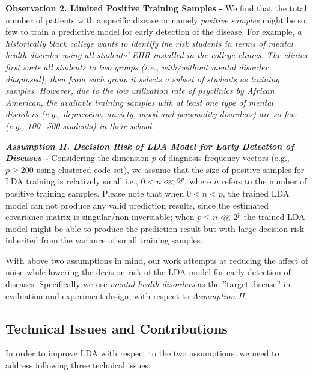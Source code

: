 \documentclass[journal,compsoc]{IEEEtran}
\begin{document}
\textbf{Observation 2. Limited Positive Training Samples - } 
We find that the total number of patients with a specific disease or namely \emph{positive samples} might be so few to train a predictive model for early detection of the disease.
For example, \emph{a historically black college wants to identify the risk students in terms of mental health disorder using all students' EHR installed in the college clinics.
The clinics first sorts all students to two groups (i.e., with/without mental disorder diagnosed), then from each group it selects a subset of students as training samples.
However, due to the low utilization rate of psyclinics by African American, the available training samples with at least one type of mental disorders (e.g., depression, anxiety, mood and personality disorders) are so few (e.g., 100$-$500 students) in their school.}  

\textbf{\em Assumption II.  Decision Risk of LDA Model for Early Detection of Diseases - } 
Considering the dimension $p$ of diagnosis-frequency vectors (e.g., $p\geq 200$ using clustered code set), we assume that the size of positive samples for LDA training is relatively small i.e., $0<n\lll 2^p$, where $n$ refers to the number of positive training samples.
Please note that when $0<n<p$, the trained LDA model can not produce any valid prediction results, since the estimated covariance matrix is singular/non-inversiable; when $p\leq n\lll 2^p$ the trained LDA model might be able to produce the prediction result but with large decision risk inherited from the variance of small training samples.


With above two assumptions in mind, our work attempts at reducing the affect of noise while lowering the decision risk of the LDA model for early detection of diseases.
Specifically we use \emph{mental health disorders} as the ''target disease'' in evaluation and experiment design, with respect to  {\em Assumption II}.


\subsection{Technical Issues and Contributions} 
In order to improve LDA with respect to the two assumptions, we need to address following three technical issues:
\end{document}
